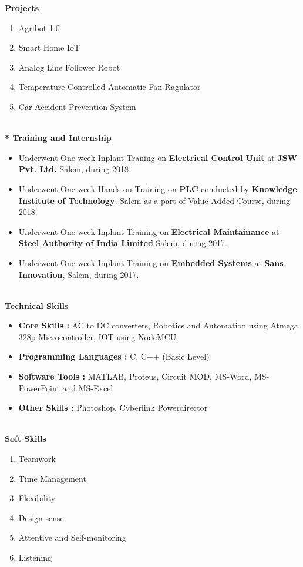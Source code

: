 \documentclass{article}
\begin{document}
	\begin{flushleft}
		\Large \textbf{Projects}
		\begin{enumerate}
			\item Agribot 1.0
			\item Smart Home IoT
			\item Analog Line Follower Robot
			\item Temperature Controlled Automatic Fan Ragulator
			\item Car Accident Prevention System
		\end{enumerate}
		
		\Large \textbf{\\* Training and Internship}\
		
		\begin{itemize}
			\item Underwent One week Inplant Traning on \textbf{Electrical Control Unit} at \textbf{JSW Pvt. Ltd.} Salem, during 2018.
			\item Underwent One week Hands-on-Training on \textbf{PLC} conducted by \textbf{Knowledge Institute of Technology}, Salem as a part of Value Added Course, during 2018. 
			\item Underwent One week Inplant Training on \textbf{Electrical Maintainance} at \textbf{Steel Authority of India Limited} Salem, during 2017.
			\item Underwent One week Inplant Training on \textbf{Embedded Systems} at \textbf{Sans Innovation}, Salem, during 2017. 
		\end{itemize}
		
		\Large \textbf{\\Technical Skills}\
		\begin{itemize}
			\item \textbf{Core Skills	:} AC to DC converters,	Robotics and Automation using Atmega 328p Microcontroller, IOT using NodeMCU
			\item \textbf{Programming Languages	:}	C, C++ (Basic Level)
			\item \textbf{Software Tools	:}	MATLAB, Proteus, Circuit MOD, MS-Word, MS-PowerPoint and MS-Excel
			\item \textbf{Other Skills	:} Photoshop, Cyberlink Powerdirector
		\end{itemize}
		
		\Large \textbf{\\Soft Skills}\
		\begin{enumerate}
			\item Teamwork
			\item Time Management
			\item Flexibility
			\item Design sense
			\item Attentive and Self-monitoring
			\item Listening
		\end{enumerate}
		

\end{flushleft}
\end{document}
